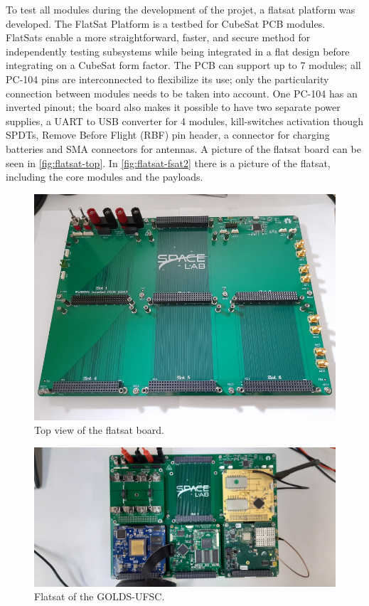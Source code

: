 To test all modules during the development of the projet, a flatsat platform was developed. The FlatSat Platform is a testbed for CubeSat PCB modules. FlatSats enable a more straightforward, faster, and secure method for independently testing subsystems while being integrated in a flat design before integrating on a CubeSat form factor. The PCB can support up to 7 modules; all PC-104 pins are interconnected to flexibilize its use; only the particularity connection between modules needs to be taken into account. One PC-104 has an inverted pinout; the board also makes it possible to have two separate power supplies, a UART to USB converter for 4 modules, kill-switches activation though SPDTs, Remove Before Flight (RBF) pin header, a connector for charging batteries and SMA connectors for antennas. A picture of the flatsat board can be seen in \autoref{fig:flatsat-top}. In \autoref{fig:flatsat-fsat2} there is a picture of the flatsat, including the core modules and the payloads.

\begin{figure}[!ht]
    \begin{center}
        \includegraphics[width=\textwidth]{figures/flatsat-top}
        \caption{Top view of the flatsat board.}
        \label{fig:flatsat-top}
    \end{center}
\end{figure}

\begin{figure}[!ht]
    \begin{center}
        \includegraphics[width=\textwidth]{figures/flatsat}
        \caption{Flatsat of the GOLDS-UFSC.}
        \label{fig:flatsat-fsat2}
    \end{center}
\end{figure}

